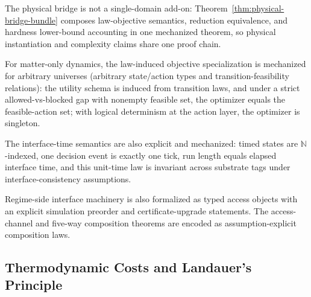 The physical bridge is not a single-domain add-on: Theorem~\ref{thm:physical-bridge-bundle} composes law-objective semantics, reduction equivalence, and hardness lower-bound accounting in one mechanized theorem, so physical instantiation and complexity claims share one proof chain.

For matter-only dynamics, the law-induced objective specialization is mechanized for arbitrary universes (arbitrary state/action types and transition-feasibility relations): the utility schema is induced from transition laws, and under a strict allowed-vs-blocked gap with nonempty feasible set, the optimizer equals the feasible-action set; with logical determinism at the action layer, the optimizer is singleton.

The interface-time semantics are also explicit and mechanized: timed states are $\mathbb{N}$-indexed, one decision event is exactly one tick, run length equals elapsed interface time, and this unit-time law is invariant across substrate tags under interface-consistency assumptions.

Regime-side interface machinery is also formalized as typed access objects with an explicit simulation preorder and certificate-upgrade statements. The access-channel and five-way composition theorems are encoded as assumption-explicit composition laws.

\subsection{Thermodynamic Costs and Landauer's Principle}


